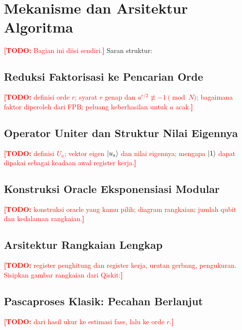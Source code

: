 \documentclass[11pt,a4paper]{article}
\newcommand{\todo}[1]{\textcolor{red}{\textbf{[TODO:} #1\textbf{]}}}
\begin{document}
\section{Mekanisme dan Arsitektur Algoritma}\label{sec:mekanisme}

\todo{Bagian ini diisi sendiri.} Saran struktur:

\subsection{Reduksi Faktorisasi ke Pencarian Orde}
\todo{definisi orde $r$; syarat $r$ genap dan $a^{r/2} \not\equiv -1 \pmod N$;
bagaimana faktor diperoleh dari FPB; peluang keberhasilan untuk $a$ acak.}

\subsection{Operator Uniter dan Struktur Nilai Eigennya}
\todo{definisi $U_a$; vektor eigen $\ket{u_s}$ dan nilai eigennya; mengapa
$\ket{1}$ dapat dipakai sebagai keadaan awal register kerja.}

\subsection{Konstruksi Oracle Eksponensiasi Modular}
\todo{konstruksi oracle yang kamu pilih; diagram rangkaian; jumlah qubit dan
kedalaman rangkaian.}

\subsection{Arsitektur Rangkaian Lengkap}
\todo{register penghitung dan register kerja, urutan gerbang, pengukuran.
Sisipkan gambar rangkaian dari Qiskit:}

\subsection{Pascaproses Klasik: Pecahan Berlanjut}
\todo{dari hasil ukur ke estimasi fase, lalu ke orde $r$.}

\end{document}
